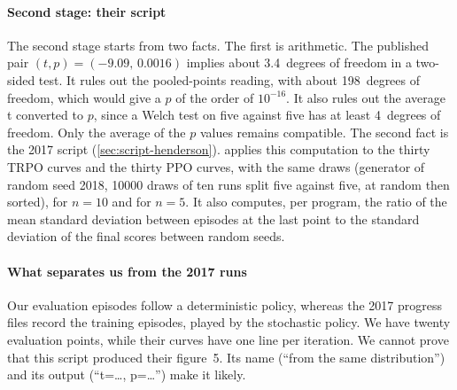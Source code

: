 \paragraph{Second stage: their script}
The second stage starts from two facts. The first is arithmetic. The published pair $(t,p)=(-9.09,\,0.0016)$ implies
about 3.4~degrees of freedom in a two-sided test. It rules out the pooled-points reading, with about
198~degrees of freedom, which would give a $p$ of the order of $10^{-16}$. It also rules out the average t
converted to $p$, since a Welch test on five against five has at least 4~degrees of freedom. Only the average
of the $p$ values remains compatible. The second fact is the 2017 script (\cref{sec:script-henderson}).
 applies this computation to the thirty TRPO curves and the thirty PPO
curves, with the same draws (generator of random seed 2018, \num{10000} draws of ten runs split five against
five, at random then sorted), for $n=10$ and for $n=5$. It also computes, per program, the ratio of the mean
standard deviation between episodes at the last point to the standard deviation of the final scores between
random seeds.

\paragraph{What separates us from the 2017 runs}
Our evaluation episodes follow a deterministic policy, whereas the 2017 progress files record the training
episodes, played by the stochastic policy. We have twenty evaluation points, while their curves have one line
per iteration. We cannot prove that this script produced their figure~5. Its name (\enquote{from the same
distribution}) and its output (\enquote{t=\dots, p=\dots}) make it likely.

